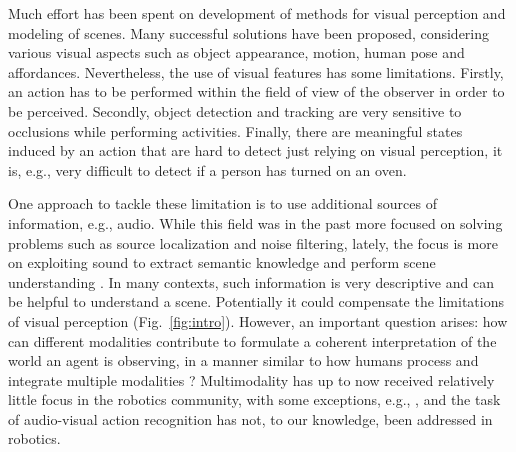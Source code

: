 \documentclass[letterpaper, 10pt, conference]{ieeeconf}
\begin{document}
Much effort has been spent on development of methods for visual perception and modeling of scenes. Many successful solutions have been proposed, considering various visual aspects such as object appearance, motion, human pose and affordances. %
Nevertheless, the use of visual features has some limitations. Firstly, an action has to be performed within the field of view of the observer in order to be perceived. Secondly, object detection and tracking are very sensitive to occlusions while performing activities. Finally, there are meaningful states induced by an action that are hard to detect just relying on visual perception, it is, e.g., very difficult to detect if a person has turned on an oven.

One approach to tackle these limitation is to use additional sources of information, e.g., audio. While this field was in the past more focused on solving problems such as source localization and noise filtering, lately, the focus is more on exploiting sound to extract semantic knowledge and perform scene understanding \cite{Lyon10}. In many contexts, such information is very descriptive and can be helpful to understand a scene. Potentially it could compensate the limitations of visual perception (Fig.~\ref{fig:intro}). However, an important question arises: how can different modalities contribute to formulate a coherent interpretation of the world an agent is observing, in a manner similar to how humans process and integrate multiple modalities  \cite{Zmigrod13}?  Multimodality has up to now received relatively little focus in the robotics community, with some exceptions, e.g.,  \cite{TeoYDFA12}, and the task of audio-visual action recognition has not, to our knowledge, been addressed in robotics.



\end{document}
